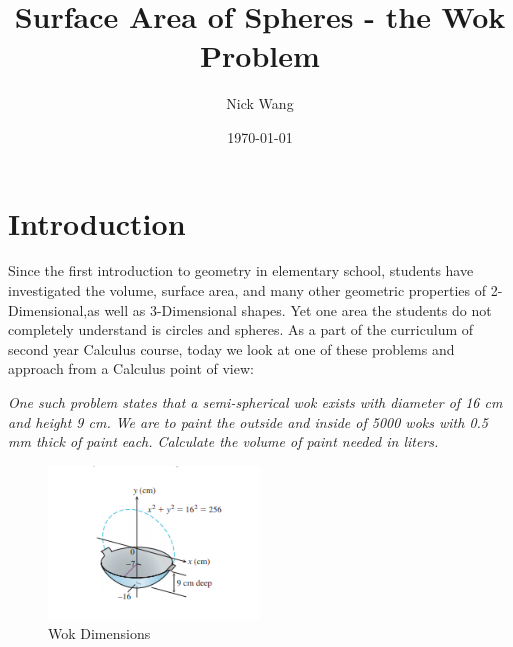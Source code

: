 \documentclass[a4paper, 12pt]{article}
\begin{document}
	
	\title{Surface Area of Spheres - the Wok Problem}
		\author{Nick Wang}
		\date{\today}
	\maketitle
	
	\section{Introduction}
		Since the first introduction to geometry in elementary school, students have investigated the volume, surface area, and many other geometric properties of 2-Dimensional,as well as 3-Dimensional shapes. Yet one area the students do not completely understand is circles and spheres. As a part of the curriculum of second year Calculus course, today we look at one of these problems and approach from a Calculus point of view:\\
		\begin{center}
			\textit {One such problem states that a semi-spherical wok exists with diameter of 16 cm and height 9 cm. We are to paint the outside and inside of 5000 woks with 0.5 mm thick of paint each. Calculate the volume of paint needed in liters. }\\
		\end{center}
		\begin{figure}[h]
			\label{wok dimensions}
			\centering
			\includegraphics[width=0.5\textwidth]{wok.png}
			\caption{Wok Dimensions}
		\end{figure}
	
\end{document}
